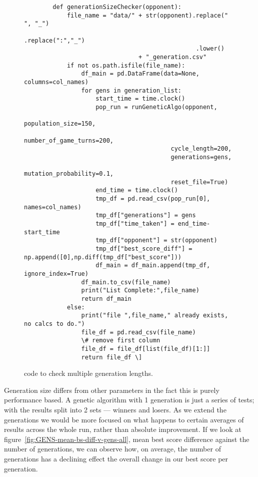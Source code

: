 \begin{figure}[ht] 
    \begin{verbatim}
        def generationSizeChecker(opponent):
            file_name = "data/" + str(opponent).replace(" ", "_")
                                                .replace(":","_")
                                                .lower() 
                                + "_generation.csv"
            if not os.path.isfile(file_name):
                df_main = pd.DataFrame(data=None, columns=col_names)
                for gens in generation_list:
                    start_time = time.clock()
                    pop_run = runGeneticAlgo(opponent,
                                         population_size=150,
                                         number_of_game_turns=200,
                                         cycle_length=200, 
                                         generations=gens,
                                         mutation_probability=0.1, 
                                         reset_file=True)
                    end_time = time.clock()
                    tmp_df = pd.read_csv(pop_run[0], names=col_names)
                    tmp_df["generations"] = gens
                    tmp_df["time_taken"] = end_time-start_time
                    tmp_df["opponent"] = str(opponent)
                    tmp_df["best_score_diff"] = np.append([0],np.diff(tmp_df["best_score"]))
                    df_main = df_main.append(tmp_df, ignore_index=True)
                df_main.to_csv(file_name)
                print("List Complete:",file_name)
                return df_main
            else:
                print("file ",file_name," already exists, no calcs to do.")
                file_df = pd.read_csv(file_name) 
                \# remove first column
                file_df = file_df[list(file_df)[1:]]
                return file_df \]
    \end{verbatim}
    \caption{code to check multiple generation lengths.}\label{code:generationChecker}
\end{figure}

Generation size differs from other parameters in the fact this is purely performance based.
A genetic algorithm with 1 generation is just a series of tests;
with the results split into 2 sets --- winners and losers.
As we extend the generations we would be more focused on what happens to certain averages of results across the whole run, rather than absolute improvement.
If we look at figure~\ref{fig:GENS-mean-bs-diff-v-gens-all}, mean best score difference against the number of generations, we can observe how, on average, the number of generations has a declining effect the overall change in our best score per generation.\\

